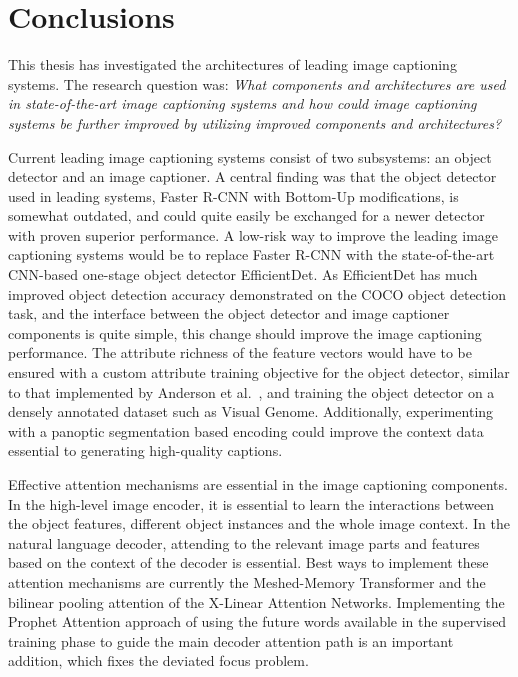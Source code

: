 \documentclass[english,twoside,openright]{HYgraduMLDS}
\begin{document}
\chapter{Conclusions}
\label{chapter:conclusions}
This thesis has investigated the architectures of leading image captioning systems. The research question was: \textit{What components and architectures are used in state-of-the-art image captioning systems and how could image captioning systems be further improved by utilizing improved components and architectures?}

Current leading image captioning systems consist of two subsystems: an object detector and an image captioner. A central finding was that the object detector used in leading systems, Faster R-CNN with Bottom-Up modifications, is somewhat outdated, and could quite easily be exchanged for a newer detector with proven superior performance. A low-risk way to improve the leading image captioning systems would be to replace Faster R-CNN with the state-of-the-art CNN-based one-stage object detector EfficientDet. As EfficientDet has much improved object detection accuracy demonstrated on the COCO object detection task, and the interface between the object detector and image captioner components is quite simple, this change should improve the image captioning performance. The attribute richness of the feature vectors would have to be ensured with a custom attribute training objective for the object detector, similar to that implemented by Anderson et al.~\cite{BottomUp}, and training the object detector on a densely annotated dataset such as Visual Genome. Additionally, experimenting with a panoptic segmentation based encoding could improve the context data essential to generating high-quality captions.

Effective attention mechanisms are essential in the image captioning components. In the high-level image encoder, it is essential to learn the interactions between the object features, different object instances and the whole image context. In the natural language decoder, attending to the relevant image parts and features based on the context of the decoder is essential. Best ways to implement these attention mechanisms are currently the Meshed-Memory Transformer and the bilinear pooling attention of the X-Linear Attention Networks. Implementing the Prophet Attention approach of using the future words available in the supervised training phase to guide the main decoder attention path is an important addition, which fixes the deviated focus problem. 
\end{document}
